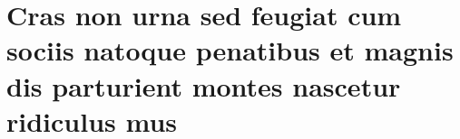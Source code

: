 %
%
%
%
%
\chapter{Cras non urna sed feugiat cum sociis natoque penatibus et magnis dis
	parturient montes nascetur ridiculus mus}

\lipsum[31]